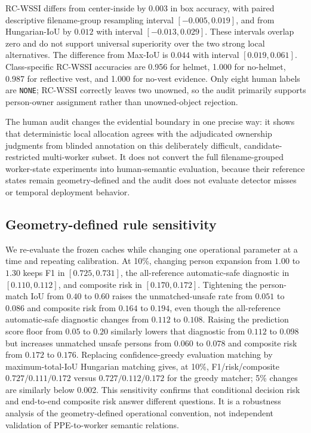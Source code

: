 \documentclass[iicol,pdflatex,sn-mathphys-num]{sn-jnl}
\begin{document}
RC-WSSI differs from center-inside by $0.003$ in box accuracy, with paired descriptive filename-group resampling interval $[-0.005,0.019]$, and from Hungarian-IoU by $0.012$ with interval $[-0.013,0.029]$. These intervals overlap zero and do not support universal superiority over the two strong local alternatives. The difference from Max-IoU is $0.044$ with interval $[0.019,0.061]$. Class-specific RC-WSSI accuracies are 0.956 for helmet, 1.000 for no-helmet, 0.987 for reflective vest, and 1.000 for no-vest evidence. Only eight human labels are \texttt{NONE}; RC-WSSI correctly leaves two unowned, so the audit primarily supports person-owner assignment rather than unowned-object rejection.

The human audit changes the evidential boundary in one precise way: it shows that deterministic local allocation agrees with the adjudicated ownership judgments from blinded annotation on this deliberately difficult, candidate-restricted multi-worker subset. It does not convert the full filename-grouped worker-state experiments into human-semantic evaluation, because their reference states remain geometry-defined and the audit does not evaluate detector misses or temporal deployment behavior.

\subsection{Geometry-defined rule sensitivity}

We re-evaluate the frozen caches while changing one operational parameter at a time and repeating calibration. At 10\%, changing person expansion from $1.00$ to $1.30$ keeps F1 in $[0.725,0.731]$, the all-reference automatic-safe diagnostic in $[0.110,0.112]$, and composite risk in $[0.170,0.172]$. Tightening the person-match IoU from $0.40$ to $0.60$ raises the unmatched-unsafe rate from $0.051$ to $0.086$ and composite risk from $0.164$ to $0.194$, even though the all-reference automatic-safe diagnostic changes from $0.112$ to $0.108$. Raising the prediction score floor from $0.05$ to $0.20$ similarly lowers that diagnostic from $0.112$ to $0.098$ but increases unmatched unsafe persons from $0.060$ to $0.078$ and composite risk from $0.172$ to $0.176$. Replacing confidence-greedy evaluation matching by maximum-total-IoU Hungarian matching gives, at 10\%, F1/risk/composite $0.727/0.111/0.172$ versus $0.727/0.112/0.172$ for the greedy matcher; 5\% changes are similarly below 0.002. This sensitivity confirms that conditional decision risk and end-to-end composite risk answer different questions. It is a robustness analysis of the geometry-defined operational convention, not independent validation of PPE-to-worker semantic relations.
\end{document}
